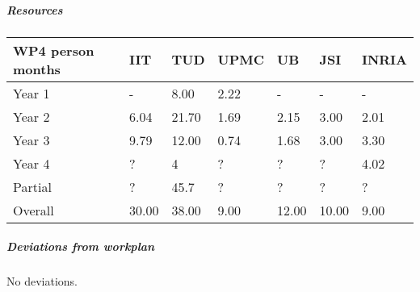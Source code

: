 
\subparagraph*{Resources}

\begin{center}
\begin{tabular}{|C{1.5cm}|C{1.5cm}|C{1.5cm}|C{2cm}|C{2cm}|C{2cm}|C{2cm}|}
\hline
\footnotesize \textbf{WP4 person months}& \footnotesize \textbf{IIT}&\footnotesize \textbf{TUD}&\footnotesize \textbf{UPMC}& \footnotesize \textbf{UB} &\footnotesize \textbf{JSI} &\footnotesize \textbf{INRIA}\\ \hline
\footnotesize Year 1  &  -  & 8.00 & 2.22 & - & - & -     \\  \hline
\footnotesize Year 2  &  6.04  & 21.70 & 1.69 & 2.15 & 3.00 & 2.01     \\  \hline
\footnotesize Year 3  &  9.79 & 12.00 & 0.74 & 1.68 & 3.00 & 3.30 \\  \hline
\footnotesize Year 4  & ?     & 4    & ?    & ?    & ?    & 4.02    \\   	\hline
\footnotesize Partial & ?     & 45.7    & ?    & ?    & ?    & ?    \\
\hline \hline
\footnotesize Overall &  30.00 & 38.00 & 9.00 & 12.00 & 10.00 & 9.00 \\ \hline
\end{tabular}
\end{center}

\subparagraph*{Deviations from workplan} 

No deviations.

